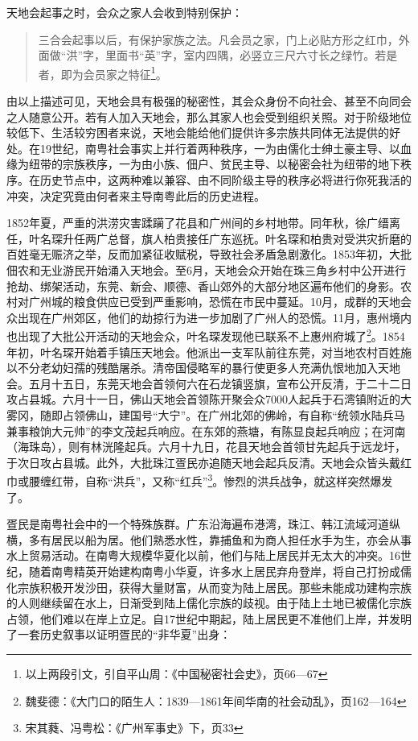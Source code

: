 天地会起事之时，会众之家人会收到特别保护：

\begin{quote}

三合会起事以后，有保护家族之法。凡会员之家，门上必贴方形之红巾，外面做“洪”字，里面书“英”字，室内四隅，必竖立三尺六寸长之绿竹。若是者，即为会员家之特征\footnote{以上两段引文，引自平山周：《中国秘密社会史》，页66—67}。

\end{quote}

由以上描述可见，天地会具有极强的秘密性，其会众身份不向社会、甚至不向同会之人随意公开。若有人加入天地会，那么其家人也会受到组织关照。对于阶级地位较低下、生活较穷困者来说，天地会能给他们提供许多宗族共同体无法提供的好处。在19世纪，南粤社会事实上并行着两种秩序，一为由儒化士绅土豪主导、以血缘为纽带的宗族秩序，一为由小族、佃户、贫民主导、以秘密会社为纽带的地下秩序。在历史节点中，这两种难以兼容、由不同阶级主导的秩序必将进行你死我活的冲突，决定究竟由何者来主导南粤此后的历史进程。

1852年夏，严重的洪涝灾害蹂躏了花县和广州间的乡村地带。同年秋，徐广缙离任，叶名琛升任两广总督，旗人柏贵接任广东巡抚。叶名琛和柏贵对受洪灾折磨的百姓毫无赈济之举，反而加紧征收赋税，导致社会矛盾急剧激化。1853年初，大批佃农和无业游民开始涌入天地会。至6月，天地会众开始在珠三角乡村中公开进行抢劫、绑架活动，东莞、新会、顺德、香山郊外的大部分地区遍布他们的身影。农村对广州城的粮食供应已受到严重影响，恐慌在市民中蔓延。10月，成群的天地会众出现在广州郊区，他们的劫掠行为进一步加剧了广州人的恐慌。11月，惠州境内也出现了大批公开活动的天地会众，叶名琛发现他已联系不上惠州府城了\footnote{魏斐德：《大门口的陌生人：1839—1861年间华南的社会动乱》，页162—164}。1854年初，叶名琛开始着手镇压天地会。他派出一支军队前往东莞，对当地农村百姓施以不分老幼妇孺的残酷屠杀。清帝国侵略军的暴行使更多人充满仇恨地加入天地会。五月十五日，东莞天地会首领何六在石龙镇竖旗，宣布公开反清，于二十二日攻占县城。六月十一日，佛山天地会首领陈开聚会众7000人起兵于石湾镇附近的大雾冈，随即占领佛山，建国号“大宁”。在广州北郊的佛岭，有自称“统领水陆兵马兼事粮饷大元帅”的李文茂起兵响应。在东郊的燕塘，有陈显良起兵响应；在河南（海珠岛），则有林洸隆起兵。六月十九日，花县天地会首领甘先起兵于远龙圩，于次日攻占县城。此外，大批珠江疍民亦追随天地会起兵反清。天地会众皆头戴红巾或腰缠红带，自称“洪兵”，又称“红兵”\footnote{宋其蕤、冯粤松：《广州军事史》下，页33}。惨烈的洪兵战争，就这样突然爆发了。

疍民是南粤社会中的一个特殊族群。广东沿海遍布港湾，珠江、韩江流域河道纵横，多有居民以船为居。他们熟悉水性，靠捕鱼和为商人担任水手为生，亦会从事水上贸易活动。在南粤大规模华夏化以前，他们与陆上居民并无太大的冲突。16世纪，随着南粤精英开始建构南粤小华夏，许多水上居民弃舟登岸，将自己打扮成儒化宗族积极开发沙田，获得大量财富，从而变为陆上居民。那些未能成功建构宗族的人则继续留在水上，日渐受到陆上儒化宗族的歧视。由于陆上土地已被儒化宗族占领，他们难以在岸上立足。自17世纪中期起，陆上居民更不准他们上岸，并发明了一套历史叙事以证明疍民的“非华夏”出身：

